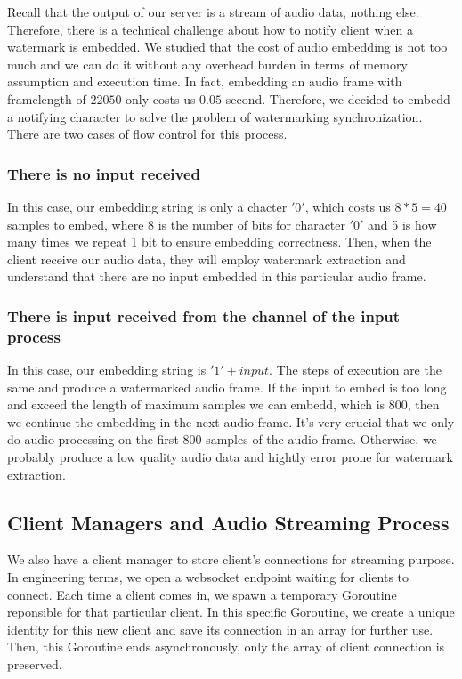 Recall that the output of our server is a stream of audio data, nothing else. Therefore, there is a technical challenge about how to notify client when a watermark is embedded. We studied that the cost of audio embedding is not too much and we can do it without any overhead burden in terms of memory assumption and execution time. In fact, embedding an audio frame with framelength of \(22050\) only costs us \(0.05\) second. Therefore, we decided to embedd a notifying character to solve the problem of watermarking synchronization. There are two cases of flow control for this process.
\subsubsection*{There is no input received}
In this case, our embedding string is only a chacter \('0'\), which costs us \(8*5=40\) samples to embed, where 8 is the number of bits for character \('0'\) and 5 is how many times we repeat 1 bit to ensure embedding correctness. Then, when the client receive our audio data, they will employ watermark extraction and understand that there are no input embedded in this particular audio frame.
\subsubsection*{There is input received from the channel of the input process}
In this case, our embedding string is \('1' + input\). The steps of execution are the same and produce a watermarked audio frame. If the input to embed is too long and exceed the length of maximum samples we can embedd, which is \(800\), then we continue the embedding in the next audio frame. It's very crucial that we only do audio processing on the first \(800\) samples of the audio frame. Otherwise, we probably produce a low quality audio data and hightly error prone for watermark extraction.

\subsection{Client Managers and Audio Streaming Process}
We also have a client manager to store client's connections for streaming purpose. In engineering terms, we open a websocket endpoint waiting for clients to connect. Each time a client comes in, we spawn a temporary Goroutine reponsible for that particular client. In this specific Goroutine, we create a unique identity for this new client and save its connection in an array for further use. Then, this Goroutine ends asynchronously, only the array of client connection is preserved.

